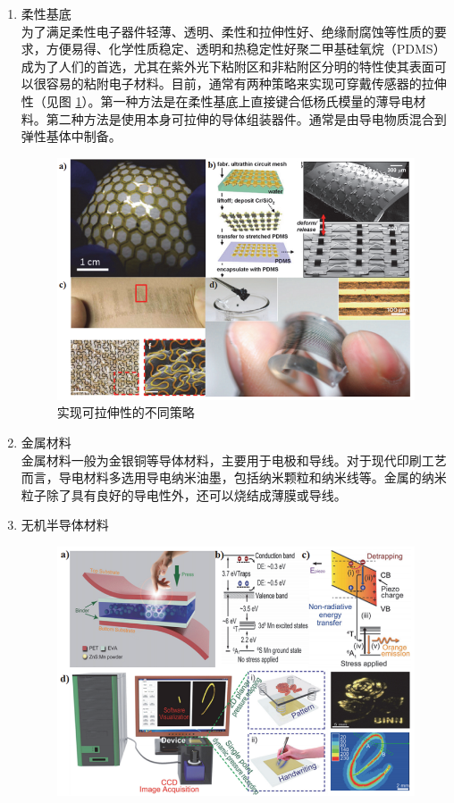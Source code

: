 \documentclass[UTF8,9pt]{ctexart}
\newcommand{\rk}[1]{\begin{enumerate}                              %
        #1
    \end{enumerate}}
\begin{document}
\rk{
    \item 柔性基底\\
    为了满足柔性电子器件轻薄、透明、柔性和拉伸性好、绝缘耐腐蚀等性质的要求，方便易得、化学性质稳定、透明和热稳定性好聚二甲基硅氧烷（PDMS）成为了人们的首选，尤其在紫外光下粘附区和非粘附区分明的特性使其表面可以很容易的粘附电子材料。目前，通常有两种策略来实现可穿戴传感器的拉伸性（见图 \ref{rx2}）。第一种方法是在柔性基底上直接键合低杨氏模量的薄导电材料。第二种方法是使用本身可拉伸的导体组装器件。通常是由导电物质混合到弹性基体中制备。
    \begin{figure}[htbp]
        \centering
        \includegraphics[scale=0.3]{11.png}
        \caption{实现可拉伸性的不同策略}
        \label{rx2} 
    \end{figure}
    \item 金属材料\\
    金属材料一般为金银铜等导体材料，主要用于电极和导线。对于现代印刷工艺而言，导电材料多选用导电纳米油墨，包括纳米颗粒和纳米线等。金属的纳米粒子除了具有良好的导电性外，还可以烧结成薄膜或导线。
    \item 无机半导体材料\\
    \begin{figure}[htbp]
        \centering
        \includegraphics[scale=0.3]{12.png}

\end{figure}}
\end{document}
